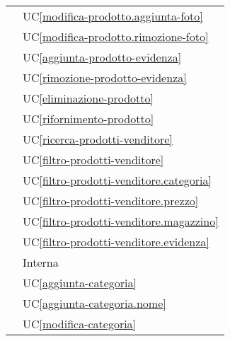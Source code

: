\begin{longtable}{C{6cm} C{6cm}}
     & UC\ref{modifica-prodotto.aggiunta-foto} \\
        
     & UC\ref{modifica-prodotto.rimozione-foto} \\
        
     & UC\ref{aggiunta-prodotto-evidenza} \\

     & UC\ref{rimozione-prodotto-evidenza} \\
        
     & UC\ref{eliminazione-prodotto} \\

     & UC\ref{rifornimento-prodotto} \\

     & UC\ref{ricerca-prodotti-venditore} \\

     & UC\ref{filtro-prodotti-venditore} \\

     & UC\ref{filtro-prodotti-venditore.categoria} \\

     & UC\ref{filtro-prodotti-venditore.prezzo} \\

     & UC\ref{filtro-prodotti-venditore.magazzino} \\

     & UC\ref{filtro-prodotti-venditore.evidenza} \\

     & Interna \\

     & UC\ref{aggiunta-categoria} \\
        
     & UC\ref{aggiunta-categoria.nome} \\
        
     & UC\ref{modifica-categoria} \\
        

\end{longtable}
